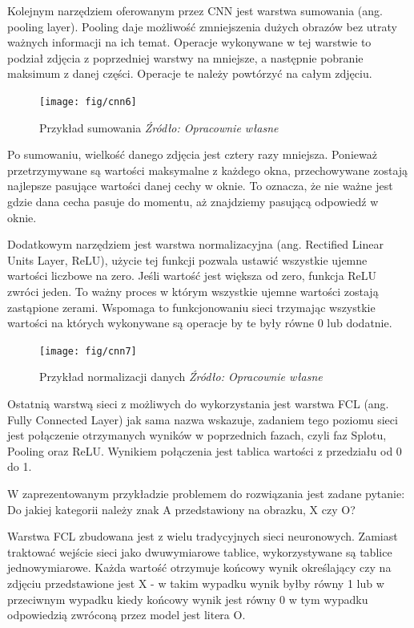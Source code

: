 \documentclass[brudnopis]{xmgr}
\begin{document}
Kolejnym narzędziem oferowanym przez CNN jest warstwa sumowania (ang. pooling layer). Pooling daje możliwość zmniejszenia dużych obrazów bez utraty ważnych informacji na ich temat. Operacje wykonywane w tej warstwie to podział zdjęcia z poprzedniej warstwy na mniejsze, a następnie pobranie maksimum z danej części. Operacje te należy powtórzyć na całym zdjęciu.

\begin{figure}[!tbh]
\centering
\texttt{[image: fig/cnn6]}
\caption{Przykład sumowania \emph{Źródło: Opracownie własne}}
\end{figure}
\newpage

Po sumowaniu, wielkość danego zdjęcia jest cztery razy mniejsza. Ponieważ przetrzymywane są wartości maksymalne z każdego okna, przechowywane zostają najlepsze pasujące wartości danej cechy w oknie. To oznacza, że nie ważne jest gdzie dana cecha pasuje do momentu, aż znajdziemy pasującą odpowiedź w oknie.

Dodatkowym narzędziem jest warstwa normalizacyjna (ang. Rectified Linear Units Layer, ReLU), użycie tej funkcji pozwala ustawić wszystkie ujemne wartości liczbowe na zero. Jeśli wartość jest większa od zero, funkcja ReLU zwróci jeden. To ważny proces w którym wszystkie ujemne wartości zostają zastąpione zerami. Wspomaga to funkcjonowaniu sieci trzymając wszystkie wartości na których wykonywane są operacje by te były równe 0 lub dodatnie.

\begin{figure}[!tbh]
\centering
\texttt{[image: fig/cnn7]}
\caption{Przykład normalizacji danych \emph{Źródło: Opracownie własne}}
\end{figure}

Ostatnią warstwą sieci z możliwych do wykorzystania jest warstwa FCL (ang. Fully Connected Layer) jak sama nazwa wskazuje, zadaniem tego poziomu sieci jest połączenie otrzymanych wyników w poprzednich fazach, czyli faz Splotu, Pooling oraz ReLU. Wynikiem połączenia jest tablica wartości z przedziału od 0 do 1. 
\newpage

W zaprezentowanym przykładzie problemem do rozwiązania jest zadane pytanie: Do jakiej kategorii należy znak A przedstawiony na obrazku, X czy O?

Warstwa FCL zbudowana jest z wielu tradycyjnych sieci neuronowych. Zamiast traktować wejście sieci jako dwuwymiarowe tablice, wykorzystywane są tablice jednowymiarowe. Każda wartość otrzymuje końcowy wynik określający czy na zdjęciu przedstawione jest X - w takim wypadku wynik byłby równy 1 lub w przeciwnym wypadku kiedy końcowy wynik jest równy 0 w tym wypadku odpowiedzią zwróconą przez model jest litera O.
\end{document}
